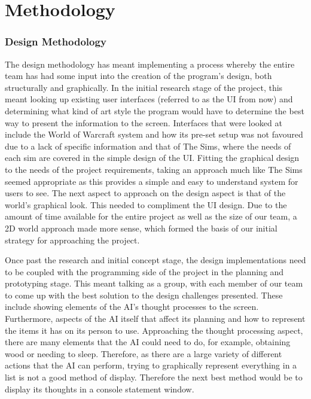 \documentclass[a4paper]{report}
\begin{document}
\chapter{Methodology}
\subsection{Design Methodology}
The design methodology has meant implementing a process whereby the entire team has had some input into the creation of the program’s design, both structurally and graphically. In the initial research stage of the project, this meant looking up existing user interfaces (referred to as the UI from now) and determining what kind of art style the program would have to determine the best way to present the information to the screen. Interfaces that were looked at include the World of Warcraft system and how its pre-set setup was not favoured due to a lack of specific information and that of The Sims, where the needs of each sim are covered in the simple design of the UI. Fitting the graphical design to the needs of the project requirements, taking an approach much like The Sims seemed appropriate as this provides a simple and easy to understand system for users to see. The next aspect to approach on the design aspect is that of the world’s graphical look. This needed to compliment the UI design. Due to the amount of time available for the entire project as well as the size of our team, a 2D world approach made more sense, which formed the basis of our initial strategy for approaching the project.

Once past the research and initial concept stage, the design implementations need to be coupled with the programming side of the project in the planning and prototyping stage. This meant talking as a group, with each member of our team to come up with the best solution to the design challenges presented. These include showing elements of the AI’s thought processes to the screen. Furthermore, aspects of the AI itself that affect its planning and how to represent the items it has on its person to use. Approaching the thought processing aspect, there are many elements that the AI could need to do, for example, obtaining wood or needing to sleep. Therefore, as there are a large variety of different actions that the AI can perform, trying to graphically represent everything in a list is not a good method of display. Therefore the next best method would be to display its thoughts in a console statement window.
\end{document}
